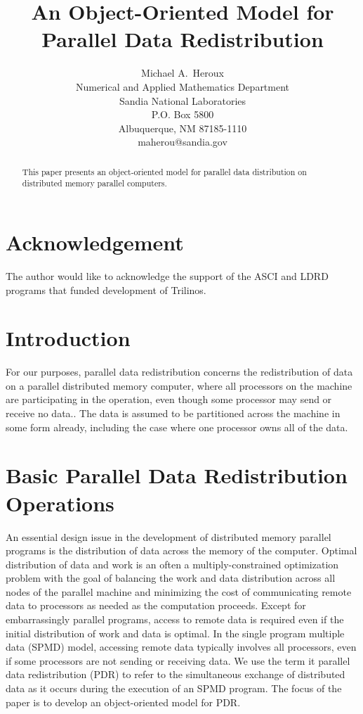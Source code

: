 \documentclass[12pt,relax]{OODataRedistribution}
\title{An Object-Oriented Model for Parallel Data Redistribution}
\author{Michael A.~Heroux\\
        Numerical and Applied Mathematics Department \\
	   Sandia National Laboratories\\
	   P.O. Box 5800\\
	   Albuquerque, NM 87185-1110 \\
	   maherou@sandia.gov \\
	 }
\date{}
\begin{document}
\maketitle

\begin{abstract}
This paper presents an object-oriented model for parallel data distribution on
distributed memory parallel computers.
\end{abstract}


\clearpage
\section*{Acknowledgement}
The author would like to acknowledge the support of the ASCI and LDRD programs
that funded development of Trilinos.


\tableofcontents

\section{Introduction}

For our purposes, parallel data redistribution concerns the redistribution of 
data on a parallel distributed memory computer, where all processors on the 
machine are participating in the operation, even though some processor may send
or receive no data..  The data is assumed to be 
partitioned across the machine in some form already, including the case where one
processor owns all of the data.


\section{Basic Parallel Data Redistribution Operations}

An essential design issue in the development of distributed memory parallel programs is the
distribution of data across the memory of the computer.  Optimal distribution of data and work
is an often a multiply-constrained optimization problem with the goal of balancing the work and
data distribution across all nodes of the parallel machine and minimizing the cost of
communicating remote data to processors as needed as the computation proceeds.
Except for embarrassingly parallel programs, access to remote data is required even if
the initial distribution of work and data is optimal.  In the single program multiple data
(SPMD) model, accessing remote data typically involves all processors, even if some processors
are not sending or receiving data.  We use the term {it parallel data
redistribution (PDR)} to refer to the simultaneous exchange of distributed data as it occurs during
the execution of an SPMD program.  The focus of the paper is to develop an object-oriented
model for PDR.
\end{document}
